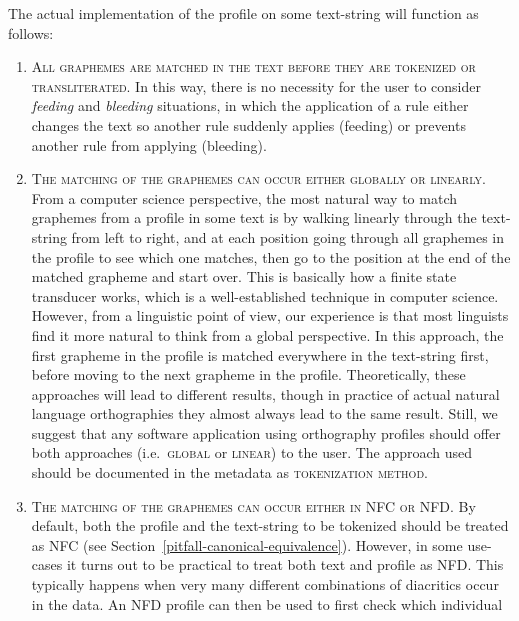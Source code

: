 \noindent The actual implementation of the profile on some text-string will function as
follows:

\begin{enumerate}
	\def\labelenumi{B\arabic{enumi}.} \setcounter{enumi}{4} 
	\item \textsc{All graphemes are matched in the text before they are tokenized
       or transliterated}. In this way, there is no necessity for the user to
       consider \textit{feeding} and \textit{bleeding} situations, in which the application of
       a rule either changes the text so another rule suddenly applies (feeding)
       or prevents another rule from applying (bleeding). 
	\item \textsc{The matching of the graphemes can occur either globally or
       linearly.} From a computer science perspective, the most natural way to
       match graphemes from a profile in some text is by walking linearly
       through the text-string from left to right, and at each position going
       through all graphemes in the profile to see which one matches, then go to
       the position at the end of the matched grapheme and start over. This is
       basically how a finite state transducer works, which is a
       well-established technique in computer science. However, from a
       linguistic point of view, our experience is that most linguists find it
       more natural to think from a global perspective. In this approach, the
       first grapheme in the profile is matched everywhere in the text-string
       first, before moving to the next grapheme in the profile. Theoretically,
       these approaches will lead to different results, though in practice of
       actual natural language orthographies they almost always lead to the same
       result. Still, we suggest that any software application using orthography
       profiles should offer both approaches (i.e.\ \textsc{global} or
       \textsc{linear}) to the user. The approach used should be documented in
       the metadata as \textsc{tokenization method}. 
	\item \textsc{The matching of the graphemes can occur either in NFC or NFD.} By
       default, both the profile and the text-string to be tokenized should be
       treated as NFC (see Section~\ref{pitfall-canonical-equivalence}). However, in some use-cases it turns out to
       be practical to treat both text and profile as NFD. This typically
       happens when very many different combinations of diacritics occur in the
       data. An NFD profile can then be used to first check which individual

\end{enumerate}
